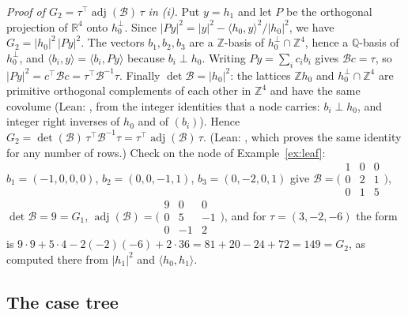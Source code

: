 \documentclass[11pt]{article}
\theoremstyle{remark}
\newcommand{\R}{\mathbb{R}}
\newcommand{\Z}{\mathbb{Z}}
\newcommand{\Q}{\mathbb{Q}}
\newcommand{\lean}[1]{{\small\texttt{\detokenize{#1}}}}
\begin{document}
\emph{Proof of $G_2=\tau^{\top}\operatorname{adj}(\mathcal B)\,\tau$ in (i).} Put $y=h_1$ and let $P$ be the orthogonal projection of $\R^4$ onto $h_0^\perp$. Since $|Py|^2=|y|^2-\langle h_0,y\rangle^2/|h_0|^2$, we have $G_2=|h_0|^2\,|Py|^2$. The vectors $b_1,b_2,b_3$ are a $\Z$-basis of $h_0^\perp\cap\Z^4$, hence a $\Q$-basis of $h_0^\perp$, and $\langle b_i,y\rangle=\langle b_i,Py\rangle$ because $b_i\perp h_0$. Writing $Py=\sum_ic_ib_i$ gives $\mathcal Bc=\tau$, so $|Py|^2=c^{\top}\mathcal Bc=\tau^{\top}\mathcal B^{-1}\tau$. Finally $\det\mathcal B=|h_0|^2$: the lattices $\Z h_0$ and $h_0^\perp\cap\Z^4$ are primitive orthogonal complements of each other in $\Z^4$ and have the same covolume (Lean: \lean{gF_compl}, from the integer identities that a node carries: $b_i\perp h_0$, and integer right inverses of $h_0$ and of $(b_i)$). Hence $G_2=\det(\mathcal B)\,\tau^{\top}\mathcal B^{-1}\tau=\tau^{\top}\operatorname{adj}(\mathcal B)\,\tau$. (Lean: \lean{gF_snoc}, which proves the same identity for any number of rows.) Check on the node of Example~\ref{ex:leaf}: $b_1=(-1,0,0,0)$, $b_2=(0,0,-1,1)$, $b_3=(0,-2,0,1)$ give $\mathcal B=\bigl(\begin{smallmatrix}1&0&0\\0&2&1\\0&1&5\end{smallmatrix}\bigr)$, $\det\mathcal B=9=G_1$, $\operatorname{adj}(\mathcal B)=\bigl(\begin{smallmatrix}9&0&0\\0&5&-1\\0&-1&2\end{smallmatrix}\bigr)$, and for $\tau=(3,-2,-6)$ the form is $9\cdot9+5\cdot4-2(-2)(-6)+2\cdot36=81+20-24+72=149=G_2$, as computed there from $|h_1|^2$ and $\langle h_0,h_1\rangle$.

\subsection{The case tree}
\end{document}
